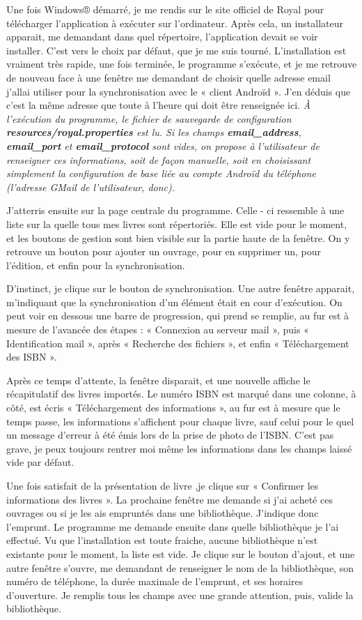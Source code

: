 Une fois Windows® démarré, je me rendis sur le site officiel de Royal pour télécharger l'application à exécuter sur l'ordinateur. 
Après cela, un installateur apparait, me demandant dans quel répertoire, l'application devait se voir installer. 
C'est vers le choix par défaut, que je me suis tourné. 
L'installation est vraiment très rapide, une fois terminée, le programme s'exécute, et je me retrouve de nouveau face à une fenêtre me demandant de choisir quelle adresse email j'allai utiliser pour la synchronisation avec le « client Androïd ». 
J'en déduis que c'est la même adresse que toute à l'heure qui doit être renseignée ici.
\emph{À l'exécution du programme, le fichier de sauvegarde de configuration \textbf{resources/royal.properties} est lu. 
	Si les champs \textbf{email\_address}, \textbf{email\_port} et \textbf{email\_protocol} sont vides, 
	on propose à l'utilisateur de renseigner ces informations, soit de façon manuelle, 
	soit en choisissant simplement la configuration de base liée au compte Androïd du téléphone (l'adresse GMail de l'utilisateur, donc).
}

J'atterris ensuite sur la page centrale du programme. 
Celle - ci ressemble à une liste sur la quelle tous mes livres sont répertoriés. 
Elle est vide pour le moment, et les boutons de gestion sont bien visible sur la partie haute de la fenêtre. 
On y retrouve un bouton pour ajouter un ouvrage, pour en supprimer un, pour l'édition, et enfin pour la synchronisation. 

D'instinct, je clique sur le bouton de synchronisation.
Une autre fenêtre apparait, m'indiquant que la synchronisation d'un élément était en cour d'exécution. 
On peut voir en dessous une barre de progression, qui prend se remplie, au fur est à mesure de l'avancée des étapes : 
« Connexion au serveur mail », puis « Identification mail », après « Recherche des fichiers », et enfin « Téléchargement des ISBN ».

Après ce temps d'attente, la fenêtre disparait, et une nouvelle affiche le récapitulatif des livres importés.
Le numéro ISBN est marqué dans une colonne, à côté, est écris « Téléchargement des informations », au fur est à mesure que le temps passe, les informations s'affichent pour chaque livre, sauf celui pour le quel un message d'erreur à été émis lors de la prise de photo de l'ISBN. 
C'est pas grave, je peux toujours rentrer moi même les informations dans les champs laissé vide par défaut. 

Une fois satisfait de la présentation de livre ,je clique sur « Confirmer les informations des livres ». 
La prochaine fenêtre me demande si j'ai acheté ces ouvrages ou si je les ais empruntés dans une bibliothèque. 
J'indique donc l'emprunt.
Le programme me demande ensuite dans quelle bibliothèque je l'ai effectué. 
Vu que l'installation est toute fraiche, aucune bibliothèque n'est existante pour le moment, la liste est vide.
Je clique sur le bouton d'ajout, et une autre fenêtre s'ouvre, me demandant de renseigner le nom de la bibliothèque, son numéro de téléphone, la durée maximale de l'emprunt, et ses horaires d'ouverture. 
Je remplis tous les champs avec une grande attention, puis, valide la bibliothèque. 


